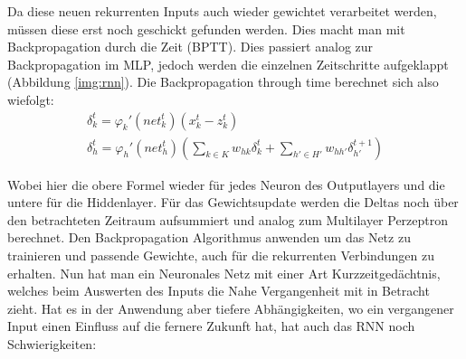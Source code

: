 Da diese neuen rekurrenten Inputs auch wieder gewichtet verarbeitet werden, müssen diese erst noch geschickt gefunden werden. Dies macht man mit Backpropagation durch die Zeit (BPTT). Dies passiert analog zur Backpropagation im MLP, jedoch werden die einzelnen Zeitschritte aufgeklappt (Abbildung \ref{img:rnn}). Die Backpropagation through time berechnet sich also wiefolgt:
\begin{gather}
	\delta_{k}^{t} = \varphi_{k}'(net_{k}^{t})(x_{k}^{t}-z^{t}_{k}) \\
	\delta_{h}^{t} = \varphi_{h}'(net_{h}^{t})(\sum_{k \in K}w_{hk}\delta^{t}_{k}+\sum_{h' \in H'}w_{hh'}\delta^{t+1}_{h'})
\end{gather}

Wobei hier die obere Formel wieder für jedes Neuron des Outputlayers und die untere für die Hiddenlayer. Für das Gewichtsupdate werden die Deltas noch über den betrachteten Zeitraum aufsummiert und analog zum Multilayer Perzeptron berechnet. Den Backpropagation Algorithmus anwenden um das Netz zu trainieren und passende Gewichte, auch für die rekurrenten Verbindungen zu erhalten. Nun hat man ein Neuronales Netz mit einer Art Kurzzeitgedächtnis, welches beim Auswerten des Inputs die Nahe Vergangenheit mit in Betracht zieht. Hat es in der Anwendung aber tiefere Abhängigkeiten, wo ein vergangener Input einen Einfluss auf die fernere Zukunft hat, hat auch das RNN noch Schwierigkeiten: 
